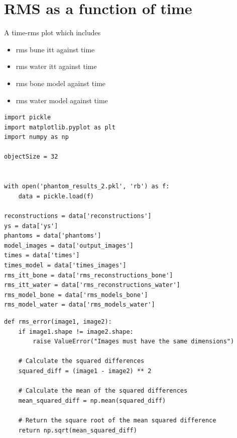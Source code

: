 \section{RMS as a function of time}

A time-rms plot which includes

\begin{itemize}
\item rms bune itt against time
\item rms water itt against time
\item rms bone model against time
\item rms water model against time
\end{itemize}

\begin{verbatim}
import pickle 
import matplotlib.pyplot as plt
import numpy as np

objectSize = 32


with open('phantom_results_2.pkl', 'rb') as f:
    data = pickle.load(f)

reconstructions = data['reconstructions']
ys = data['ys']
phantoms = data['phantoms']
model_images = data['output_images']
times = data['times']
times_model = data['times_images']
rms_itt_bone = data['rms_reconstructions_bone']
rms_itt_water = data['rms_reconstructions_water']
rms_model_bone = data['rms_models_bone']
rms_model_water = data['rms_models_water']
\end{verbatim}

\begin{verbatim}
def rms_error(image1, image2):
    if image1.shape != image2.shape:
        raise ValueError("Images must have the same dimensions")

    # Calculate the squared differences
    squared_diff = (image1 - image2) ** 2

    # Calculate the mean of the squared differences
    mean_squared_diff = np.mean(squared_diff)

    # Return the square root of the mean squared difference
    return np.sqrt(mean_squared_diff)
\end{verbatim}

